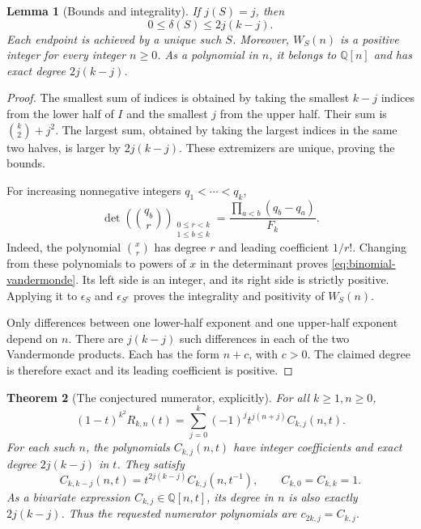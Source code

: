 \documentclass[11pt,a4paper]{article}
\newtheorem{theorem}{Theorem}[section]
\newtheorem{lemma}[theorem]{Lemma}
\theoremstyle{definition}
\theoremstyle{remark}
\newcommand{\Q}{\mathbb Q}
\numberwithin{equation}{section}
\begin{document}
\begin{lemma}[Bounds and integrality]
\label{lem:blocks}
If \(j(S)=j\), then
\begin{equation}
 0\le\delta(S)\le 2j(k-j).
 \label{eq:delta-bounds}
\end{equation}
Each endpoint is achieved by a unique such \(S\). Moreover, \(W_S(n)\)
is a positive integer for every integer \(n\ge0\). As a polynomial in
\(n\), it belongs to \(\Q[n]\) and has exact degree \(2j(k-j)\).
\end{lemma}
\begin{proof}
The smallest sum of indices is obtained by taking the smallest \(k-j\)
indices from the lower half of \(I\) and the smallest \(j\) from the upper
half. Their sum is \(\binom{k}{2}+j^2\). The largest sum, obtained by
taking the largest indices in the same two halves, is larger by
\(2j(k-j)\). These extremizers are unique, proving the bounds.

For increasing nonnegative integers \(q_1<\cdots<q_k\),
\begin{equation}
 \det\left(\binom{q_b}{r}\right)_{
      \substack{0\le r<k\\1\le b\le k}}
 =\frac{\prod_{a<b}(q_b-q_a)}{F_k}.
 \label{eq:binomial-vandermonde}
\end{equation}
Indeed, the polynomial \(\binom{x}{r}\) has degree \(r\) and leading
coefficient \(1/r!\). Changing from these polynomials to powers of \(x\)
in the determinant proves \eqref{eq:binomial-vandermonde}. Its left side
is an integer, and its right side is strictly positive. Applying it to
\(\epsilon_S\) and \(\epsilon_{S^c}\) proves the integrality and
positivity of \(W_S(n)\).

Only differences between one lower-half exponent and one upper-half
exponent depend on \(n\). There are \(j(k-j)\) such differences in each
of the two Vandermonde products. Each has the form \(n+c\), with \(c>0\).
The claimed degree is therefore exact and its leading coefficient is positive.
\end{proof}

\begin{theorem}[The conjectured numerator, explicitly]
\label{thm:numerator}
For all \(k\ge1,n\ge0\),
\begin{equation}
 \boxed{\displaystyle
 (1-t)^{k^2}R_{k,n}(t)
 =\sum_{j=0}^{k}(-1)^j t^{j(n+j)}C_{k,j}(n,t).}
 \label{eq:numerator}
\end{equation}
For each such \(n\), the polynomials \(C_{k,j}(n,t)\) have integer
coefficients and exact degree \(2j(k-j)\) in \(t\). They satisfy
\begin{equation}
 C_{k,k-j}(n,t)=t^{2j(k-j)}C_{k,j}(n,t^{-1}),
 \qquad C_{k,0}=C_{k,k}=1.
 \label{eq:C-reciprocity}
\end{equation}
As a bivariate expression \(C_{k,j}\in\Q[n,t]\), its degree in \(n\) is
also exactly \(2j(k-j)\). Thus the requested numerator polynomials are
\(c_{2k,j}=C_{k,j}\).
\end{theorem}
\end{document}
